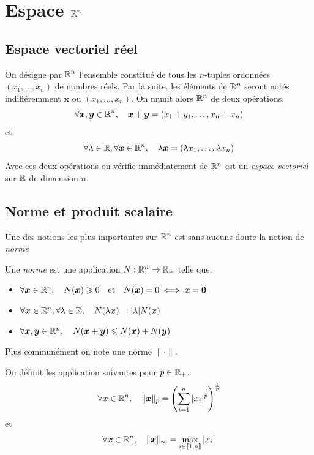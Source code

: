 \section{Espace $\mathbb{R}^n$}
\subsection{Espace vectoriel réel}
On désigne par $\mathbb{R}^n$ l'ensemble constitué de tous les $n$-tuples ordonnées $(x_1, \ldots, x_n)$ de nombres réels. Par la suite, les éléments de $\mathbb{R}^n$ seront notés indifféremment $\bm x$ ou $(x_1, \ldots, x_n)$. On munit alors $\mathbb{R}^n$ de deux opérations,
\[
 \forall \bm x, \bm y \in \mathbb{R}^n, \quad  \bm x + \bm y = (x_1 + y_1, \ldots, x_n + x_n)
\]
et 
\[
\forall \lambda \in \mathbb{R}, \forall \bm x \in \mathbb{R}^n, \quad \lambda \bm x = (\lambda x_1, \ldots, \lambda x_n)
\]
Avec ces deux opérations on vérifie immédiatement de $\mathbb{R}^n$ est un \emph{espace vectoriel} sur $\mathbb{R}$ de dimension $n$.

\subsection{Norme et produit scalaire}
Une des notions les plus importantes sur $\mathbb{R}^n$ est sans aucuns doute la notion de \emph{norme}

\begin{definition}[Norme] \label{def: norme}
	Une \emph{norme} est une application $N : \mathbb{R}^n \to \mathbb{R}_+$ telle que,
	\begin{itemize}
		\item $\forall \bm x \in \mathbb{R}^n, \quad N(\bm x) \geqslant 0 \quad \text{et} \quad N(\bm x) = 0 \iff \bm x = \bm 0$
		\item $\forall \bm x \in \mathbb{R}^n, \forall \lambda \in \mathbb{R}, \quad N(\lambda \bm x) = |\lambda| N(\bm x)$
		\item $\forall \bm x, \bm y \in \mathbb{R}^n, \quad N(\bm x + \bm y) \leqslant N(\bm x) + N(\bm y)$
	\end{itemize}
	Plus communément on note une norme $\| \cdot \|$.
\end{definition}

\begin{definition} \label{def: norme sur rn}
	On définit les application suivantes pour $p \in \mathbb{R}_+$, 
	\[
	\forall \bm x \in \mathbb{R}^n, \quad \| \bm x \|_p = \left(\sum_{i=1}^n |x_i|^p \right)^{\frac{1}{p}}
	\]
	et
	\[
	\forall \bm x \in \mathbb{R}^n, \quad \| \bm x \|_\infty = \max_{i \in \llbracket 1,n \rrbracket} |x_i|
	\]
\end{definition}

